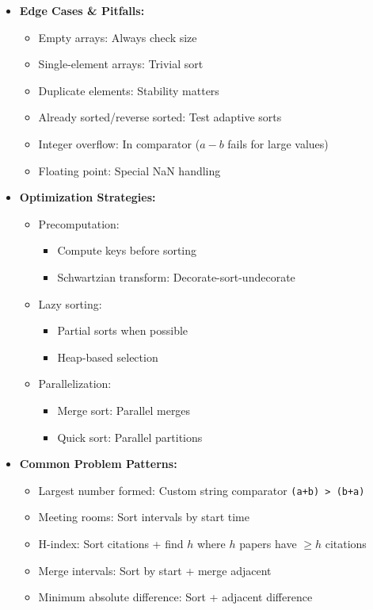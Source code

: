 \documentclass[a4paper,10pt]{book}
\begin{document}
\begin{itemize}
    \item \textbf{Edge Cases \& Pitfalls:}
    \begin{itemize}
        \item Empty arrays: Always check size
        \item Single-element arrays: Trivial sort
        \item Duplicate elements: Stability matters
        \item Already sorted/reverse sorted: Test adaptive sorts
        \item Integer overflow: In comparator ($a - b$ fails for large values)
        \item Floating point: Special NaN handling
    \end{itemize}
    
    \item \textbf{Optimization Strategies:}
    \begin{itemize}
        \item Precomputation:
        \begin{itemize}
            \item Compute keys before sorting
            \item Schwartzian transform: Decorate-sort-undecorate
        \end{itemize}
        \item Lazy sorting:
        \begin{itemize}
            \item Partial sorts when possible
            \item Heap-based selection
        \end{itemize}
        \item Parallelization:
        \begin{itemize}
            \item Merge sort: Parallel merges
            \item Quick sort: Parallel partitions
        \end{itemize}
    \end{itemize}
    
    \item \textbf{Common Problem Patterns:}
    \begin{itemize}
        \item Largest number formed: Custom string comparator \texttt{(a+b) > (b+a)}
        \item Meeting rooms: Sort intervals by start time
        \item H-index: Sort citations + find $h$ where $h$ papers have $\geq h$ citations
        \item Merge intervals: Sort by start + merge adjacent
        \item Minimum absolute difference: Sort + adjacent difference
    \end{itemize}
    

\end{itemize}
\end{document}
